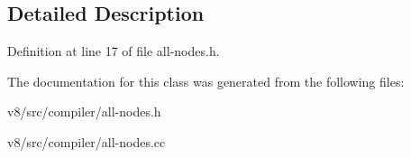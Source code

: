 \subsection{Detailed Description}


Definition at line 17 of file all-\/nodes.\+h.



The documentation for this class was generated from the following files\+:\begin{DoxyCompactItemize}
\item 
v8/src/compiler/all-\/nodes.\+h\item 
v8/src/compiler/all-\/nodes.\+cc\end{DoxyCompactItemize}
